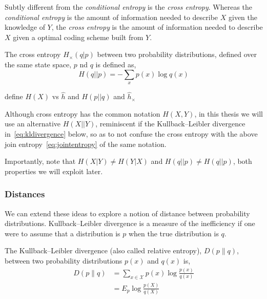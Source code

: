 Subtly different from the \emph{conditional entropy} is the \emph{cross entropy}. Whereas the \emph{conditional entropy} is the amount of information needed to describe $X$ given the knowledge of $Y$, the \emph{cross entropy} is the amount of information needed to describe $X$ given a optimal coding scheme built from $Y$. 

\begin{definition}\label{def:crossentropy}
	The cross entropy $H_{\times} (q|p)$ between two probability distributions, defined over the same state space, $p$ nd $q$ is defined as, 
	\begin{equation}
	H (q||p)= - \sum_{x} p(x) \log {q(x)}
	\end{equation}
\end{definition}

define $H(X)$ vs $\hat{h}$ and $H(p||q)$ and $\hat{h}_{\times}$

Although cross entropy has the common notation $H(X, Y)$, in this thesis we will use an alternative $H(X||Y)$, reminiscent if the Kullback–Leibler divergence in~\autoref{eq:kldivergence} below, so as to not confuse the cross entropy with the above join entropy~\autoref{eq:jointentropy} of the same notation.


\begin{remark}
	Importantly, note that $H(X|Y) \neq  H(Y|X)$ and $H(q||p) \neq H (q||p)$, both properties we will exploit later.
\end{remark}


\subsubsection{Distances}
We can extend these ideas to explore a notion of distance between probability distributions. Kullback–Leibler divergence is a measure of the inefficiency if one were to assume that a distribution is $p$ when the true distribution is $q$.

\begin{definition}
	The Kullback–Leibler divergence (also called relative entropy), $D(p \|q)$,  between two probability distributions $p(x)$ and $q(x)$ is,
	\begin{align} \label{eq:kldivergence}
		D(p \| q) &=\sum_{x \in \mathcal{X}} p(x) \log \frac{p(x)}{q(x)} \\ 
					 &=E_{p} \log \frac{p(X)}{q(X)} 
	\end{align}
\end{definition}

